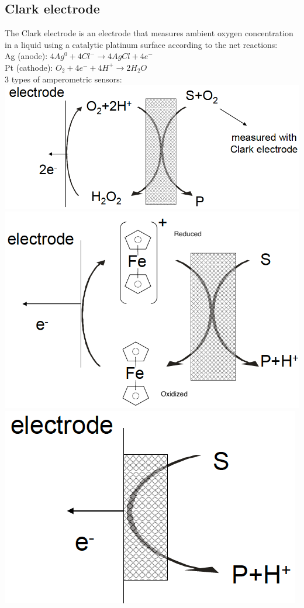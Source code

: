 \documentclass[9pt]{article}
\begin{document}
\begin{multicols}{2}
\subsection{Clark electrode}
The Clark electrode is an electrode that measures ambient oxygen concentration in a liquid using a catalytic platinum surface according to the net reactions:\\
Ag (anode): $4Ag^0+4Cl^- \rightarrow 4AgCl+4e^-$\\
Pt (cathode): $O_2+4e^-+4H^+ \rightarrow 2H_2O$\\
3 types of amperometric sensors:\\
\includegraphics[scale=0.1]{Images/O2_based_sensor.png}
\includegraphics[scale=0.1]{Images/mediator_based_sensor.png}
\includegraphics[scale=0.1]{Images/Directly-Coupled_Enzymes.png}\\

\end{multicols}
\end{document}
